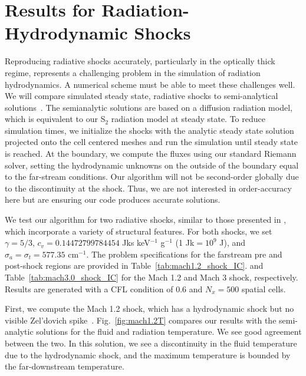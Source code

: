 \documentclass[preprint,12pt]{elsarticle}
\begin{document}
\section{Results for Radiation-Hydrodynamic Shocks}
\label{sec:ShockSolutions}

Reproducing radiative shocks accurately, particularly in the optically thick
regime, represents a challenging problem in the simulation of radiation
hydrodynamics. A numerical scheme must be able to meet these
challenges well.  We will compare simulated steady state, radiative shocks to semi-analytical solutions~\cite{lowrie3}. The
semianalytic solutions are based on a diffusion radiation model, which is equivalent to our S$_2$ radiation model at steady state.
To reduce simulation times, we initialize the shocks with the analytic steady state solution projected onto the cell centered meshes
and run the simulation until steady state is reached.
At the boundary, we compute the fluxes using our
standard Riemann solver, setting the hydrodynamic unknowns on the outside of the boundary equal to the far-stream conditions.  
Our algorithm will not be second-order globally due to the discontinuity at the shock.  Thus, we are not interested in
order-accuracy here but are ensuring our code produces accurate solutions.

We test our algorithm for two radiative shocks, similar to those presented in
\cite{lowrie3}, which incorporate a variety of structural features.  For both shocks, we set $\gamma = 5/3$,
$c_v=0.14472799784454$ Jks keV$^{-1}$ g$^{-1}$ (1 Jk$=10^9$ J), and $\sigma_a = \sigma_t = 577.35$ cm$^{-1}$. 
The problem specifications for the farstream pre and post-shock regions are provided in Table~\ref{tab:mach1.2_shock_IC}.
and Table~\ref{tab:mach3.0_shock_IC} for the Mach 1.2 and Mach 3 shock, respectively.
Results are generated with a CFL condition of 0.6 and $N_x=500$ spatial cells.

First, we compute the Mach 1.2 shock, which has a hydrodynamic shock but no
visible Zel'dovich spike~\cite{lowrie3}.  Fig.~\ref{fig:mach1.2T} compares our
results with the semi-analytic solutions for the fluid and
radiation temperature.  We see good agreement between
the two.  In this solution, we see a discontinuity in the fluid temperature due to the hydrodynamic shock, 
and the maximum temperature is bounded by the far-downstream temperature.
\end{document}
